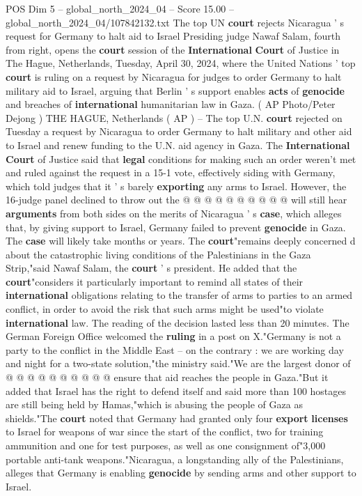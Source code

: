 \begin{textsample}{POS Dim 5 – global\_north\_2024\_04 – Score 15.00 – global\_north\_2024\_04/107842132.txt}  \label{ex:f5_pos_284}
The top UN \textbf{court} rejects Nicaragua ' s request for Germany to halt aid to Israel Presiding judge Nawaf Salam, fourth from right, opens the \textbf{court} session of the \textbf{International} \textbf{Court} of Justice in The Hague, Netherlands, Tuesday, April 30, 2024, where the United Nations ' top \textbf{court} is ruling on a request by Nicaragua for judges to order Germany to halt military aid to Israel, arguing that Berlin ' s support enables \textbf{acts} of \textbf{genocide} and breaches of \textbf{international} humanitarian law in Gaza. ( AP Photo/Peter Dejong ) THE HAGUE, Netherlands ( AP ) -- The top U.N. \textbf{court} rejected on Tuesday a request by Nicaragua to order Germany to halt military and other aid to Israel and renew funding to the U.N. aid agency in Gaza.
The \textbf{International} \textbf{Court} of Justice said that \textbf{legal} conditions for making such an order weren't met and ruled against the request in a 15-1 vote, effectively siding with Germany, which told judges that it ' s barely \textbf{exporting} any arms to Israel.
However, the 16-judge panel declined to throw out the @ @ @ @ @ @ @ @ @ @ will still hear \textbf{arguments} from both sides on the merits of Nicaragua ' s \textbf{case}, which alleges that, by giving support to Israel, Germany failed to prevent \textbf{genocide} in Gaza.
The \textbf{case} will likely take months or years.
The \textbf{court}"remains deeply concerned d about the catastrophic living conditions of the Palestinians in the Gaza Strip,"said Nawaf Salam, the \textbf{court} ' s president.
He added that the \textbf{court}"considers it particularly important to remind all states of their \textbf{international} obligations relating to the transfer of arms to parties to an armed conflict, in order to avoid the risk that such arms might be used"to violate \textbf{international} law.
The reading of the decision lasted less than 20 minutes.
The German Foreign Office welcomed the \textbf{ruling} in a post on X."Germany is not a party to the conflict in the Middle East -- on the contrary : we are working day and night for a two-state solution,"the ministry said."We are the largest donor of @ @ @ @ @ @ @ @ @ @ ensure that aid reaches the people in Gaza."But it added that Israel has the right to defend itself and said more than 100 hostages are still being held by Hamas,"which is abusing the people of Gaza as shields."The \textbf{court} noted that Germany had granted only four \textbf{export} \textbf{licenses} to Israel for weapons of war since the start of the conflict, two for training ammunition and one for test purposes, as well as one consignment of"3,000 portable anti-tank weapons."Nicaragua, a longstanding ally of the Palestinians, alleges that Germany is enabling \textbf{genocide} by sending arms and other support to Israel.

\end{textsample}
